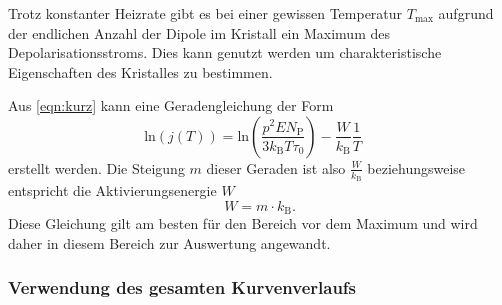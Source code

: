         Trotz konstanter Heizrate gibt es bei einer gewissen Temperatur $T_\text{max}$ aufgrund der endlichen Anzahl der Dipole im Kristall ein Maximum des Depolarisationsstroms.
        Dies kann genutzt werden um charakteristische Eigenschaften des Kristalles zu bestimmen.        
       	
        Aus \autoref{eqn:kurz} kann eine Geradengleichung der Form
        \begin{equation}
            \text{ln}(j(T)) = \text{ln}\left(\frac{p^2EN_\text{P}}{3k_\text{B}T\tau_0}\right) - \frac{W}{k_\text{B}} \frac{1}{T} \quad 
        \end{equation}
        erstellt werden.
        Die Steigung $m$ dieser Geraden ist also $\frac{W}{k_\text{B}}$ beziehungsweise entspricht die Aktivierungsenergie $W$
        \begin{equation}
            W = m \cdot k_\text{B}.
            \label{eqn:W}
        \end{equation}
        Diese Gleichung gilt am besten für den Bereich vor dem Maximum und wird daher in diesem Bereich zur Auswertung angewandt.			

\subsubsection{Verwendung des gesamten Kurvenverlaufs}

